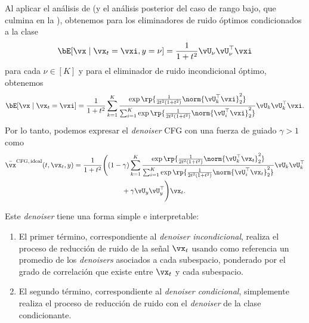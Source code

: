 \documentclass[../../book-main_es.tex]{subfiles}
\begin{document}
\begin{example}
    Al aplicar el análisis de  (y el
        análisis posterior del caso de rango bajo, que culmina en la
    ), obtenemos para los eliminadores de ruido óptimos
    condicionados a la clase
    \begin{equation}\label{eq:gmm_lowrank_denoiser-ch6-classcond}
        \bE[ \vx \mid \vx_t = \vxi, y = \nu ]
        = \frac{1}{1 + t^{2}}
        \vU_{\nu}\vU_{\nu}^{\top}\vxi
    \end{equation}
    para cada $\nu \in [K]$ y para el eliminador de ruido incondicional óptimo,
    obtenemos
    \begin{equation}\label{eq:gmm_lowrank_denoiser-ch6-uncond}
        \bE[ \vx \mid \vx_t = \vxi ]
        = \frac{1}{1 + t^{2}}\sum_{k =
        1}^{K}\frac{\exp\rp{\frac{1}{2t^{2}(1 +
        t^{2})}\norm{\vU_{k}^{\top}\vxi}_{2}^{2}}}{\sum_{i =
            1}^{K}\exp\rp{\frac{1}{2t^{2}(1 +
        t^{2})}\norm{\vU_{i}^{\top}\vxi}_{2}^{2}}}\vU_{k}\vU_{k}^{\top}\vxi.
    \end{equation}
    Por lo tanto, podemos expresar el \textit{denoiser} CFG con una fuerza de guiado $\gamma
    > 1$ como
    \begin{equation}\label{eq:cfg-denoiser-mog-low-rank}
        \begin{split}
            \bar{\vx}^{\mathrm{CFG,\,ideal}}(t, \vx_t, y)
            =
            \frac{1}{1 + t^{2}}
            \Biggl(
                &(1 - \gamma)
                \sum_{k = 1}^{K}\frac{\exp\rp{\frac{1}{2t^{2}(1
                + t^{2})}\norm{\vU_{k}^{\top}\vx_t}_{2}^{2}}}{\sum_{i
                    = 1}^{K}\exp\rp{\frac{1}{2t^{2}(1
                                +
                t^{2})}\norm{\vU_{i}^{\top}\vx_t}_{2}^{2}}}\vU_{k}\vU_{k}^{\top}
                \\
                &\qquad+
                \gamma
                \vU_{y}\vU_{y}^{\top}
            \Biggr)
            \vx_t.
        \end{split}
    \end{equation}

    Este \textit{denoiser} tiene una forma simple e interpretable:
    \begin{enumerate}
        \item El primer término, correspondiente al \textit{denoiser incondicional},
            realiza el proceso de reducción de ruido de la señal $\vx_t$ usando como referencia un promedio de los
            \textit{denoisers} asociados a cada subespacio, ponderado por el grado de correlación
            que existe entre $\vx_t$ y cada subespacio.
        \item El segundo término, correspondiente al \textit{denoiser condicional}, 
            simplemente realiza el proceso de reducción de ruido con el \textit{denoiser}
            de la clase condicionante.
    \end{enumerate}


\end{example}
\end{document}
